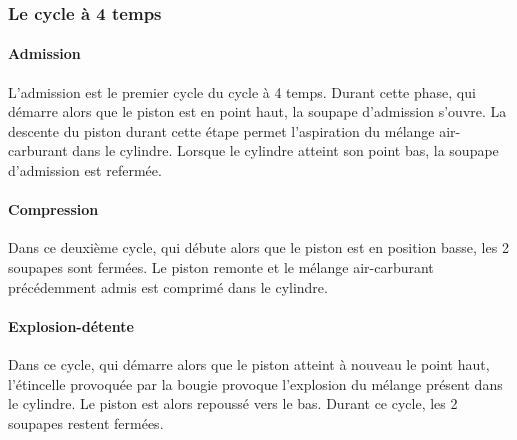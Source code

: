 		\subsubsection{Le cycle à 4 temps}
		\renewcommand{\echelleTikz}{0.5}
		\paragraph{Admission}
		
		L'admission est le premier cycle du cycle à 4 temps. Durant cette phase, qui démarre alors que le piston est en point haut, la soupape d'admission s'ouvre. La descente du piston durant cette étape permet l'aspiration du mélange air-carburant dans le cylindre. Lorsque le cylindre atteint son point bas, la soupape d'admission est refermée.

		\begin{figure}[H]
  		\centering
    		
		\end{figure}	
	
		\paragraph{Compression}
		
		Dans ce deuxième cycle, qui débute alors que le piston est en position basse, les 2 soupapes sont fermées. Le piston remonte et le mélange air-carburant précédemment admis est comprimé dans le cylindre.
		
		\begin{figure}[H]
  		\centering
    		
		\end{figure}	
		
		\paragraph{Explosion-détente}
		
		Dans ce cycle, qui démarre alors que le piston atteint à nouveau le point haut, l'étincelle provoquée par la bougie provoque l'explosion du mélange présent dans le cylindre. Le piston est alors repoussé vers le bas. Durant ce cycle, les 2 soupapes restent fermées.
		
		\begin{figure}[H]
  		\centering
		
		\end{figure}	
		
